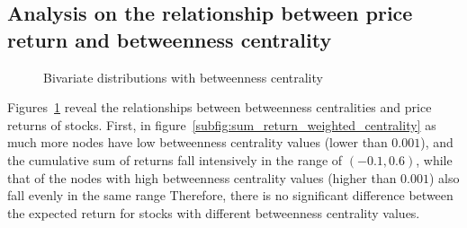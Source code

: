 \subsection{Analysis on the relationship between price return and betweenness centrality}
\begin{figure}
	\hfill%
	\caption{Bivariate distributions with betweenness centrality} \label{fig:bivariate}
\end{figure}

Figures~\ref{fig:bivariate} reveal the relationships between betweenness centralities and price returns of stocks. First, in figure~\ref{subfig:sum_return_weighted_centrality} as much more nodes have low betweenness centrality values (lower than $0.001$), and the cumulative sum of returns fall intensively in the range of $(-0.1, 0.6)$, while that of the nodes with high betweenness centrality values (higher than $0.001$) also fall evenly in the same range Therefore, there is no significant difference between the expected return for stocks with different betweenness centrality values.

